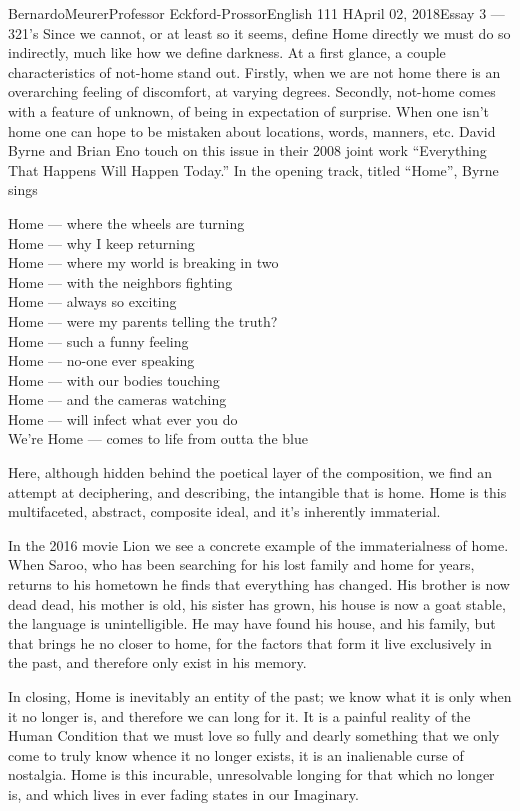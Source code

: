 \documentclass[12pt,letterpaper]{article}
\begin{document}
\begin{mla}{Bernardo}{Meurer}{Professor Eckford-Prossor}{English 111 H}{April 02, 2018}{Essay 3 --- 321's}
	Since we cannot, or at least so it seems, define Home directly we must do so indirectly, much like how we define darkness. At a first glance, a couple characteristics of not-home stand out. Firstly, when we are not home there is an overarching feeling of discomfort, at varying degrees. Secondly, not-home comes with a feature of unknown, of being in expectation of surprise. When one isn't home one can hope to be mistaken about locations, words, manners, etc.
	David Byrne and Brian Eno touch on this issue in their 2008 joint work ``Everything That Happens Will Happen Today.'' In the opening track, titled ``Home'', Byrne sings
	\begin{blocks}
		Home --- where the wheels are turning\\
		Home --- why I keep returning\\
		Home --- where my world is breaking in two\\
		Home --- with the neighbors fighting\\
		Home --- always so exciting\\
		Home --- were my parents telling the truth?\\
		Home --- such a funny feeling\\
		Home --- no-one ever speaking\\
		Home --- with our bodies touching\\
		Home --- and the cameras watching\\
		Home --- will infect what ever you do\\
		We're Home --- comes to life from outta the blue\\
	\end{blocks}
	Here, although hidden behind the poetical layer of the composition, we find an attempt at deciphering, and describing, the intangible that is home. Home is this multifaceted, abstract, composite ideal, and it's inherently immaterial.

	In the 2016 movie Lion we see a concrete example of the immaterialness of home. When Saroo, who has been searching for his lost family and home for years, returns to his hometown he finds that everything has changed. His brother is now dead dead, his mother is old, his sister has grown, his house is now a goat stable, the language is unintelligible.
	He may have found his house, and his family, but that brings he no closer to home, for the factors that form it live exclusively in the past, and therefore only exist in his memory.

	In closing, Home is inevitably an entity of the past; we know what it is only when it no longer is, and therefore we can long for it. It is a painful reality of the Human Condition that we must love so fully and dearly something that we only come to truly know whence it no longer exists, it is an inalienable curse of nostalgia. Home is this incurable, unresolvable longing for that which no longer is, and which lives in ever fading states in our Imaginary.
\end{mla}
\end{document}
